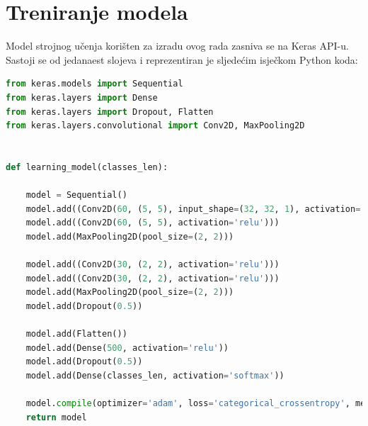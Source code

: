 \documentclass[times, utf8, zavrsni]{fer}
\begin{document}
\section{Treniranje modela}
Model strojnog učenja korišten za izradu ovog rada zasniva se na Keras API-u.
Sastoji se od jedanaest slojeva i reprezentiran je sljedećim isječkom Python koda:
\begin{lstlisting}[language=Python]
from keras.models import Sequential
from keras.layers import Dense
from keras.layers import Dropout, Flatten
from keras.layers.convolutional import Conv2D, MaxPooling2D


def learning_model(classes_len):

    model = Sequential()
    model.add((Conv2D(60, (5, 5), input_shape=(32, 32, 1), activation='relu')))
    model.add((Conv2D(60, (5, 5), activation='relu')))
    model.add(MaxPooling2D(pool_size=(2, 2)))

    model.add((Conv2D(30, (2, 2), activation='relu')))
    model.add((Conv2D(30, (2, 2), activation='relu')))
    model.add(MaxPooling2D(pool_size=(2, 2)))
    model.add(Dropout(0.5))

    model.add(Flatten())
    model.add(Dense(500, activation='relu'))
    model.add(Dropout(0.5))
    model.add(Dense(classes_len, activation='softmax'))

    model.compile(optimizer='adam', loss='categorical_crossentropy', metrics=['accuracy'])
    return model
\end{lstlisting}
\end{document}
